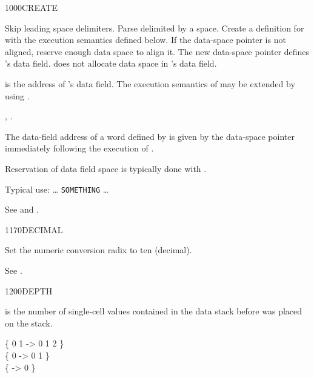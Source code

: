 \begin{worddef}{1000}{CREATE}
\item {}

	Skip leading space delimiters. Parse  delimited by a
	space. Create a definition for  with the execution
	semantics defined below. If the data-space pointer is not
	aligned, reserve enough data space to align it. The new
	data-space pointer defines 's data field.
	 does not allocate data space in 's
	data field.

\execute[name]

	 is the address of 's data field.
	The execution semantics of  may be extended by
	using .

\see {},
	.

	\begin{defer}
	\rationale %
		The data-field address of a word defined by  is
		given by the data-space pointer immediately following the
		execution of .

		Reservation of data field space is typically done with
		.

		Typical use: {\ldots}
			 \texttt{SOMETHING} {\ldots}

	\testing\rmfamily
		See  and .
	\end{defer}
\end{worddef}


\begin{worddef}{1170}{DECIMAL}
\item \stack{}{}

	Set the numeric conversion radix to ten (decimal).

	\begin{defer}
	\testing
		\rmfamily
		See \rref{core:BASE}{BASE}.
	\end{defer}
\end{worddef}


\begin{worddef}{1200}{DEPTH}
\item {}

	 is the number of single-cell values contained in the
	data stack before  was placed on the stack.

	\begin{defer}
	\testing
		\{ 0 1  -> 0 1 2 \} \\
		\{   0  -> 0 1   \} \\
		\{      -> 0     \}
	\end{defer}
\end{worddef}


